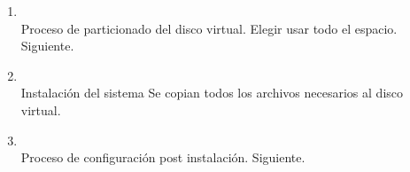\documentclass[11pt]{article}
\begin{document}
\begin{enumerate}
		    \item 
		    	\begin{minipage}[t]{\linewidth}
			        \raggedright
			        \medskip
			        \\Proceso de particionado del disco virtual. Elegir usar todo el espacio. Siguiente. 
		        \end{minipage}

		    \item 
		    	\begin{minipage}[t]{\linewidth}
			        \raggedright
			        \medskip
			        \\Instalación del sistema Se copian todos los archivos necesarios al disco virtual. 
		        \end{minipage}

		    \item
		    	\begin{minipage}[t]{\linewidth}
			        \raggedright
			        \medskip
			        \\Proceso de configuración post instalación. Siguiente. 
		        \end{minipage}


\end{enumerate}
\end{document}
